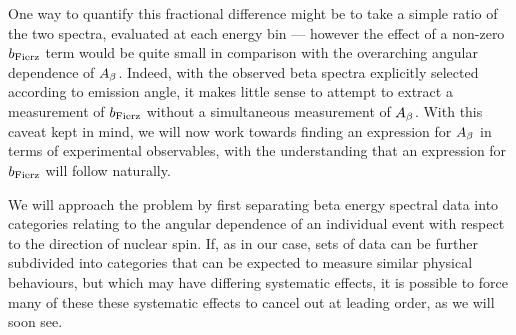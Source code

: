 One way to quantify this fractional difference might be to take a simple ratio of the two spectra, evaluated at each energy bin --- however the effect of a non-zero $b_{\mathrm{Fierz}}$ term would be quite small in comparison with the overarching angular dependence of $A_{\beta}$.  Indeed, with the observed beta spectra explicitly selected according to emission angle, it makes little sense to attempt to extract a measurement of $b_{\mathrm{Fierz}}$ without a simultaneous measurement of $A_{\beta}$.  With this caveat kept in mind, we will now work towards finding an expression for $A_{\beta}$ in terms of experimental observables, with the understanding that an expression for $b_{\mathrm{Fierz}}$ will follow naturally.  

We will approach the problem by first separating beta energy spectral data into categories relating to the angular dependence of an individual event with respect to the direction of nuclear spin.  %
If, as in our case, sets of data can be further subdivided into categories that can be expected to measure similar physical behaviours, but which may have differing systematic effects, it is possible to force many of these these systematic effects to cancel out at leading order, as we will soon see.  

